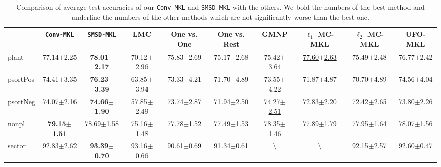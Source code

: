 \documentclass{article}
\begin{document}
\begin{table*}[t]
\small
\footnotesize
\scriptsize
   \caption{
     \normalsize  Comparison of average test accuracies of our \texttt{Conv-MKL} and \texttt{SMSD-MKL} with the others. %
    We bold the numbers of the best method and underline the numbers of the other methods
    which are not significantly worse than the best one.
   }
   \label{tabel:accuracy}
    \begin{tabular*}{\linewidth}{@{\extracolsep{-0.24cm}}lccccccccc}
    \toprule
                   &\texttt{Conv-MKL}          &\texttt{SMSD-MKL}         &LMC                 & One vs. One              & One vs. Rest                                              & GMNP                      & $\ell_1$ MC-MKL          & $\ell_2$ MC-MKL    & UFO-MKL                  \\ \hline
plant              &77.14$\pm$2.25             & \textbf{78.01$\pm$2.17}  & 70.12$\pm$2.96     & 75.83$\pm$2.69           &75.17$\pm$2.68       &75.42$\pm$3.64    & \underline{77.60$\pm$2.63}&75.49$\pm$2.48            &76.77$\pm$2.42\\
psortPos           &74.41$\pm$3.35             & \textbf{76.23$\pm$3.39}  &63.85$\pm$3.94      &73.33$\pm$4.21            &71.70$\pm$4.89       & 73.55$\pm$4.22   &71.87$\pm$4.87             &70.70$\pm$4.89            &74.56$\pm$4.04\\
psortNeg           &74.07$\pm$2.16             & \textbf{74.66$\pm$1.90}  &57.85$\pm$2.49      &73.74$\pm$2.87            &71.94$\pm$2.50   &\underline{74.27$\pm$2.51}   &72.83$\pm$2.20                             &72.42$\pm$2.65      &73.80$\pm$2.26 \\
nonpl              & \textbf{79.15$\pm$1.51}   &78.69$\pm$1.58            &75.16$\pm$1.48      &77.78$\pm$1.52            &77.49$\pm$1.53 &78.35$\pm$1.46    &77.89$\pm$1.79             &77.95$\pm$1.64            &78.07$\pm$1.56\\
sector             &\underline{92.83$\pm$2.62} & \textbf{93.39$\pm$0.70}  &93.16$\pm$0.66      &90.61$\pm$0.69            &91.34$\pm$0.61                   &$\setminus$                         &$\setminus$                   &92.15$\pm$2.57            &92.60$\pm$0.47\\

\end{tabular*}
\end{table*}
\end{document}
